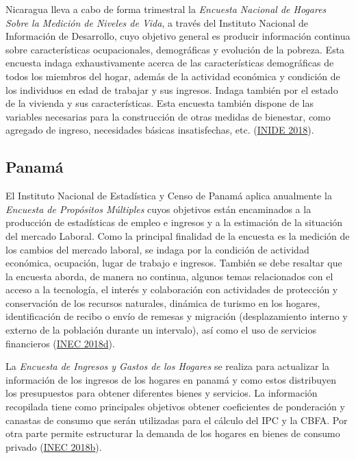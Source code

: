 \documentclass[
  12pt,
  spanish,
]{book}
\begin{document}
Nicaragua lleva a cabo de forma trimestral la \emph{Encuesta Nacional de Hogares Sobre la Medición de Niveles de Vida}, a través del Instituto Nacional de Información de Desarrollo, cuyo objetivo general es producir información continua sobre características ocupacionales, demográficas y evolución de la pobreza. Esta encuesta indaga exhaustivamente acerca de las características demográficas de todos los miembros del hogar, además de la actividad económica y condición de los individuos en edad de trabajar y sus ingresos. Indaga también por el estado de la vivienda y sus características. Esta encuesta también dispone de las variables necesarias para la construcción de otras medidas de bienestar, como agregado de ingreso, necesidades básicas insatisfechas, etc. (\protect\hyperlink{ref-INIDE-NI}{INIDE 2018}).

\hypertarget{panamuxe1}{%
\subsection*{Panamá}\label{panamuxe1}}

El Instituto Nacional de Estadística y Censo de Panamá aplica anualmente la \emph{Encuesta de Propósitos Múltiples} cuyos objetivos están encaminados a la producción de estadísticas de empleo e ingresos y a la estimación de la situación del mercado Laboral. Como la principal finalidad de la encuesta es la medición de los cambios del mercado laboral, se indaga por la condición de actividad económica, ocupación, lugar de trabajo e ingresos. También se debe resaltar que la encuesta aborda, de manera no continua, algunos temas relacionados con el acceso a la tecnología, el interés y colaboración con actividades de protección y conservación de los recursos naturales, dinámica de turismo en los hogares, identificación de recibo o envío de remesas y migración (desplazamiento interno y externo de la población durante un intervalo), así como el uso de servicios financieros (\protect\hyperlink{ref-INEC-PA}{INEC 2018d}).

La \emph{Encuesta de Ingresos y Gastos de los Hogares} se realiza para actualizar la información de los ingresos de los hogares en panamá y como estos distribuyen los presupuestos para obtener diferentes bienes y servicios. La información recopilada tiene como principales objetivos obtener coeficientes de ponderación y canastas de consumo que serán utilizadas para el cálculo del IPC y la CBFA. Por otra parte permite estructurar la demanda de los hogares en bienes de consumo privado (\protect\hyperlink{ref-INEC2-PA}{INEC 2018b}).
\end{document}
